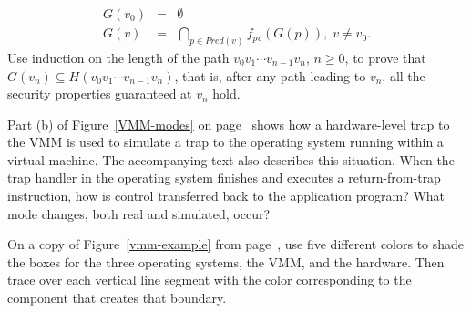 \begin{chapterEnumerate}
\begin{eqnarray*}
G(v_0) &=& \emptyset\\
G(v) &=& \bigcap_{p \in Pred(v)} f_{pv}(G(p)),\; v \neq v_0.
\end{eqnarray*}
Use induction on the length of the path $v_0v_1\cdots v_{n-1}v_n$,
$n \geq 0$, to prove that $G(v_n) \subseteq H(v_0v_1\cdots
v_{n-1}v_n)$, that is, after any path leading to $v_n$, all the security
properties guaranteed at $v_n$ hold.
\item\label{VM-trap-return-exercise}
Part (b) of Figure~\ref{VMM-modes} on page~\pageref{VMM-modes} shows
how a hardware-level trap to the VMM is used to simulate a trap to the
operating system running within a virtual machine.  The accompanying
text also describes this situation.  When the trap
handler in the operating system finishes and executes a
return-from-trap instruction, how is control transferred back to the
application program?  What mode changes, both real and simulated, occur?
\item
On a copy of Figure~\ref{vmm-example} from page~\pageref{vmm-example}, use five different colors to shade the boxes for the three operating systems, the VMM, and the hardware.  Then trace over each vertical line segment with the color corresponding to the component that creates that boundary.
\end{chapterEnumerate}

